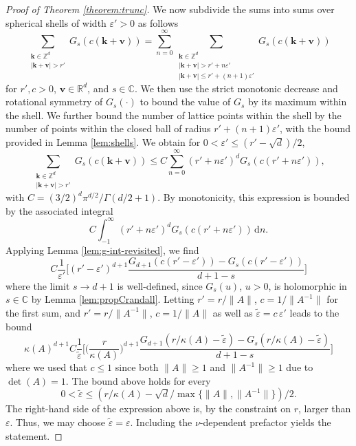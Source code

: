 \documentclass[10pt,a4paper]{amsart}
\begin{document}
\begin{proof}[Proof of Theorem \ref{theorem:trunc}]
We now subdivide the sums into sums over spherical shells of width 
$\varepsilon'>0$ as follows
$$\sum_{\substack{\bm k\in \mathds Z^d\\ |\bm k + \bm v|> r'}}G_{s}
(c(\bm{k} + \bm v)) = \sum_{n = 0}^\infty \sum_{\substack{\bm k\in \mathds Z^d\\ |\bm k + \bm v|> r'+n\varepsilon'\\|\bm k + \bm v|\le  r'+(n+1)\varepsilon' }} G_{s}
(c(\bm{k} + \bm v)) 
$$
for
$r',c>0$, $\bm v\in\mathds R^d$, and $s\in \mathds C$.
We then use the strict monotonic decrease and rotational symmetry of $G_s(\cdot)$ to bound the value of $G_s$ by its maximum within the shell. We further bound the number of lattice points within the shell by the number of points within the closed ball of radius $r'+(n+1)\varepsilon'$, with the bound provided in 
Lemma \ref{lem:shells}. We obtain for 
$0<\varepsilon'\le (r'-\sqrt{d})/2$,
$$
\sum_{\substack{\bm k\in \mathds Z^d\\ |\bm k + \bm v|> r'}}G_{s}
(c(\bm{k} + \bm v))
\le
C\sum_{n=0}^{\infty}
(r'+n\varepsilon')^d
G_{s}
(c(r'+n\varepsilon')),
$$
with $C=(3/2)^d\pi^{d/2}/\Gamma(d/2+1)$.
By monotonicity,
this expression is bounded by the associated integral
$$
C\int_{-1}^{\infty}
(r'+n\varepsilon')^d
G_{s}
(c(r'+n\varepsilon'))\,\mathrm d n.
$$
Applying 
Lemma \ref{lem:g-int-revisited}, we find
$$
C
\frac 1{\varepsilon'}\Big[(r'-\varepsilon')^{d+1}
\frac{G_{d+1}(c(r'-\varepsilon')) - G_s(c(r'-\varepsilon'))}{d+1-s}
\Big]
$$
where the limit $s\to d+1$  is well-defined, since $G_{s}(u)$, $u>0$,
is holomorphic in $s\in\mathds C$ by 
Lemma \ref{lem:propCrandall}.
Letting
 $r'=r/\|A\|$, $c=1/\|A^{-1}\|$
 for the first sum, and $r'=r/\|A^{-1}\|$, $c=1/\|A\|$
 as well as $\tilde\varepsilon=c \,\varepsilon'$
 leads to the bound
$$
\kappa(A)^{d+1}C
\frac 1{\tilde\varepsilon}\Big[
\Big(\frac r{\kappa(A)}\Big)^{d+1}
\frac{G_{d+1}(r/\kappa(A)-\tilde\varepsilon) - G_s(r/\kappa(A)-\tilde\varepsilon)}{d+1-s}
\Big]
$$
where we used that $c\le 1$ since both $\|A\|\ge 1$ and $\|A^{-1}\|\ge 1$ due to $\det(A)=1$.
The bound above holds
for every
$$
0<\tilde\varepsilon\le 
(r/\kappa(A)-\sqrt{d}/\max\{\|A\|,\|A^{-1}\|\})/2.
$$
The right-hand side of the expression above is, by the constraint on $r$, larger than $\varepsilon$.
Thus, we may choose $\tilde{\varepsilon}=\varepsilon$.
Including the $\nu$-dependent prefactor yields the statement.
\end{proof}
\end{document}
